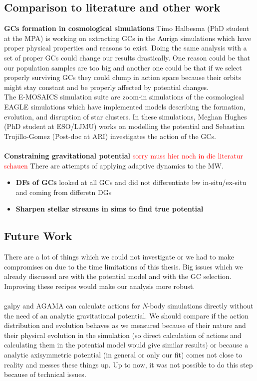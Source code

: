 \subsection{Comparison to literature and other work}
\textbf{\acp{GC} formation in cosmological simulations} Timo Halbesma (PhD student at the MPA) is working on extracting \acp{GC} in the Auriga simulations which have proper physical properties and reasons to exist. Doing the same analysis with a set of proper \acp{GC} could change our results drastically. One reason could be that our population samples are too big and another one could be that if we select properly surviving \acp{GC} they could clump in action space because their orbits might stay constant and be properly affected by potential changes.\\
The E-MOSAICS simulation suite \citep{Pfeffer...E-MOSAICS...2018, Kruijssen...E-MOSAICS.MW..2018} are zoom-in simulations of the cosmological EAGLE \citep{Schaye...EAGLE...2015} simulations which have implemented models describing the formation, evolution, and disruption of star clusters. In these simulations, Meghan Hughes (PhD student at ESO/LJMU) works on modelling the potential and Sebastian Trujillo-Gomez (Post-doc at ARI) investigates the action of the \acp{GC}. 
\\\\
\textbf{Constraining gravitational potential}
\textcolor{red}{sorry muss hier noch in die literatur schauen}
There are attempts of applying adaptive dynamics to the \ac{MW}.
\begin{itemize}
    \item \textbf{\acp{DF} of \acp{GC}} \citep{Posti...MWmassGCs...2018}
    looked at all GCs and did not differentiate bw in-situ/ex-situ and coming from differetn \acp{DG}
    \item \textbf{Sharpen stellar streams in sims to find true potential} \citep{Sanderson...streams..adaptivedyn...2015, Sanderson...gravpotstreams...2017}
\end{itemize}


\subsection{Future Work}
There are a lot of things which we could not investigate or we had to make compromises on due to the time limitations of this thesis. Big issues which we already discussed are with the potential model and with the \ac{GC} selection. Improving these recipes would make our analysis more robust.
\\\\
galpy and AGAMA \citep{Vasiliev...AGAMA...2019} can calculate actions for \textit{N}-body simulations directly without the need of an analytic gravitational potential. We should compare if the action distribution and evolution behaves as we measured because of their nature and their physical evolution in the simulation (so direct calculation of actions and calculating them in the potential model would give similar results) or because a analytic axisymmetric potential (in general or only our fit) comes not close to reality and messes these things up. Up to now, it was not possible to do this step because of technical issues. 

